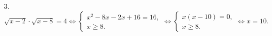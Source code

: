 3. $\sqrt{x-2}\cdot\sqrt{x-8}=4\Leftrightarrow \begin{cases} x^2-8x-2x+16=16,\\ x\geqslant8.\end{cases}
\Leftrightarrow \begin{cases} x(x-10)=0,\\ x\geqslant8.\end{cases}\Leftrightarrow x=10.$\\
